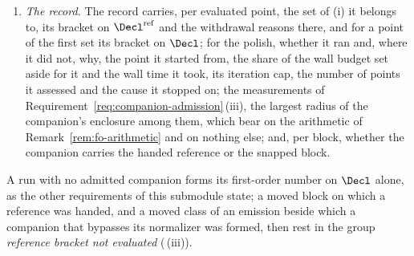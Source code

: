 \begin{requirement}
\begin{enumerate}[label=(\roman*),leftmargin=2.4em]
  (\,(iii)), and a run that declares
   refuses there (\,(iv)).
  Where (iii) applies but the key length the run reports is formed from a
  number certified on $\Decl$ in the fallback of
  Requirement~\ref{req:certified-evaluation}\,(i), no number formed on the
  companion reaches that key length, and the number it is formed from reads
  the snapped blocks: the moved blocks on which the companion carries the
  handed reference and the data sectors whose normalizer it bypasses are
  then not evaluated off their snap, condition (ii) of
   failing for them. The record
  names them as resting on  in
  the group \emph{reference bracket withdrawn} with the cause
  (\,(iii)(b)), beside the moved blocks
  on which the companion carries the snapped block, which rest as above. The
  run decides this after the certified evaluation and before any key length
  is reported, and no block is then named as evaluated off its
  snap. A run that declares  forms no such
  number (Requirement~\ref{req:certified-evaluation}\,(i)).
\item \emph{The record.} The record carries, per evaluated point, the set
  of (i) it belongs to, its bracket on $\Decl^{\mathrm{ref}}$ and the
  withdrawal reasons there, and for a point of the first set its bracket on
  $\Decl$; for the polish, whether it ran and, where it did not, why, the
  point it started from, the share of the wall budget set aside for it and
  the wall time it took, its iteration cap, the number of points it
  assessed and the cause it stopped on; the measurements of
  Requirement~\ref{req:companion-admission}\,(iii), the largest radius of the
  companion's enclosure among them, which bear on the arithmetic of
  Remark~\ref{rem:fo-arithmetic} and on nothing else; and, per block,
  whether the companion
  carries the handed reference or the snapped block.
\end{enumerate}
A run with no admitted companion forms its first-order number on $\Decl$
alone, as the other requirements of this submodule state; a moved block on
which a reference was handed, and a moved class of an emission beside which a
companion that bypasses its normalizer was formed, then rest in the group
\emph{reference bracket not evaluated}
(\,(iii)).
\end{requirement}
